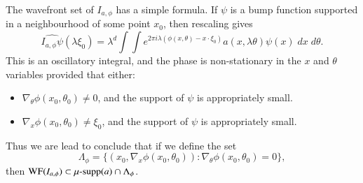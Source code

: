 The wavefront set of $I_{a,\phi}$ has a simple formula. If $\psi$ is a bump function supported in a neighbourhood of some point $x_0$, then rescaling gives
%
\[ \widehat{I_{a,\phi} \psi}(\lambda \xi_0) = \lambda^d \int \int e^{2 \pi i \lambda (\phi(x,\theta) - x \cdot \xi_0)} a(x,\lambda \theta) \psi(x)\; dx\; d\theta. \]
%
This is an oscillatory integral, and the phase is non-stationary in the $x$ and $\theta$ variables provided that either:%
\begin{itemize}
	\item $\nabla_\theta \phi(x_0,\theta_0) \neq 0$, and the support of $\psi$ is appropriately small.

	\item $\nabla_x \phi(x_0,\theta_0) \neq \xi_0$, and the support of $\psi$ is appropriately small.
\end{itemize}
%
Thus we are lead to conclude that if we define the set
%
\[ \Lambda_\phi = \{ (x_0, \nabla_x \phi(x_0,\theta_0)) : \nabla_\theta \phi(x_0, \theta_0) = 0 \}, \]
%
then $\text{WF}(I_{a,\phi}) \subset \operatorname{\text{$\mu$-supp}}(a) \cap \Lambda_\phi$.

